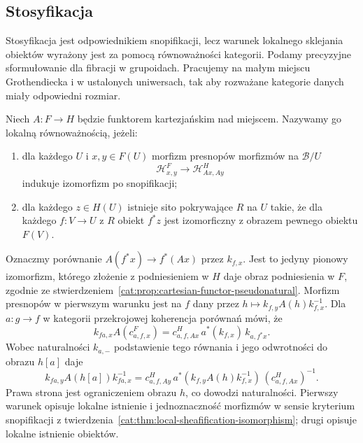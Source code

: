 \subsection{Stosyfikacja}

Stosyfikacja jest odpowiednikiem snopifikacji, lecz warunek lokalnego sklejania obiektów wyrażony jest za pomocą równoważności kategorii. Podamy precyzyjne sformułowanie dla fibracji w grupoidach. Pracujemy na małym miejscu Grothendiecka i w ustalonych uniwersach, tak aby rozważane kategorie danych miały odpowiedni rozmiar.

\begin{definicja}\label{cat:def:local-equivalence-stacks}
Niech $A:F\to H$ będzie funktorem kartezjańskim nad miejscem. Nazywamy go lokalną równoważnością, jeżeli:
\begin{enumerate}
\item dla każdego $U$ i $x,y\in F(U)$ morfizm presnopów morfizmów na $\mathcal B/U$
\[
 \mathcal H^F_{x,y}\longrightarrow\mathcal H^H_{Ax,Ay}
\]
indukuje izomorfizm po snopifikacji;
\item dla każdego $z\in H(U)$ istnieje sito pokrywające $R$ na $U$ takie, że dla każdego $f:V\to U$ z $R$ obiekt $f^*z$ jest izomorficzny z obrazem pewnego obiektu $F(V)$.
\end{enumerate}
\end{definicja}

Oznaczmy porównanie $A(f^*x)\to f^*(Ax)$ przez $k_{f,x}$. Jest to jedyny pionowy izomorfizm, którego złożenie z podniesieniem w $H$ daje obraz podniesienia w $F$, zgodnie ze stwierdzeniem~\ref{cat:prop:cartesian-functor-pseudonatural}. Morfizm presnopów w pierwszym warunku jest na $f$ dany przez $h\mapsto k_{f,y}A(h)k_{f,x}^{-1}$. Dla $a:g\to f$ w kategorii przekrojowej koherencja porównań mówi, że
\[
 k_{fa,x} A(c^F_{a,f,x})
 =c^H_{a,f,Ax}\,a^*(k_{f,x})\,k_{a,f^*x}.
\]
Wobec naturalności $k_{a,-}$ podstawienie tego równania i jego odwrotności do obrazu $h[a]$ daje
\[
 k_{fa,y} A(h[a])k_{fa,x}^{-1}
 = c^H_{a,f,Ay}\,a^*(k_{f,y}A(h)k_{f,x}^{-1})\,
                  (c^H_{a,f,Ax})^{-1}.
\]
Prawa strona jest ograniczeniem obrazu $h$, co dowodzi naturalności. Pierwszy warunek opisuje lokalne istnienie i jednoznaczność morfizmów w sensie kryterium snopifikacji z twierdzenia~\ref{cat:thm:local-sheafification-isomorphism}; drugi opisuje lokalne istnienie obiektów.

